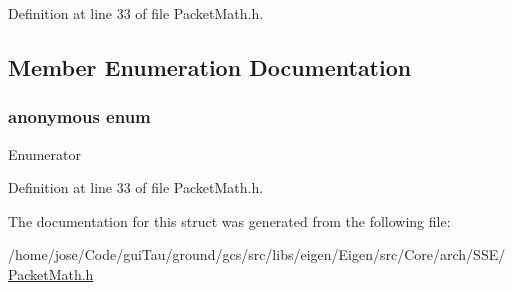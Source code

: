 Definition at line 33 of file Packet\-Math.\-h.



\subsection{Member Enumeration Documentation}
\hypertarget{structei__packet__traits_3_01double_01_4_ab0ca2d4fab56f6c285a8488ea736c7de}{\subsubsection[{anonymous enum}]{\setlength{\rightskip}{0pt plus 5cm}anonymous enum}}\label{structei__packet__traits_3_01double_01_4_ab0ca2d4fab56f6c285a8488ea736c7de}
\begin{Desc}
\item[Enumerator]\par
\begin{description}
\item[{\em 
\hypertarget{structei__packet__traits_3_01double_01_4_ab0ca2d4fab56f6c285a8488ea736c7dea6a6de0554c28903bf1d10faa9ccbe244}{size}\label{structei__packet__traits_3_01double_01_4_ab0ca2d4fab56f6c285a8488ea736c7dea6a6de0554c28903bf1d10faa9ccbe244}
}]\end{description}
\end{Desc}


Definition at line 33 of file Packet\-Math.\-h.



The documentation for this struct was generated from the following file\-:\begin{DoxyCompactItemize}
\item 
/home/jose/\-Code/gui\-Tau/ground/gcs/src/libs/eigen/\-Eigen/src/\-Core/arch/\-S\-S\-E/\hyperlink{_s_s_e_2_packet_math_8h}{Packet\-Math.\-h}\end{DoxyCompactItemize}
